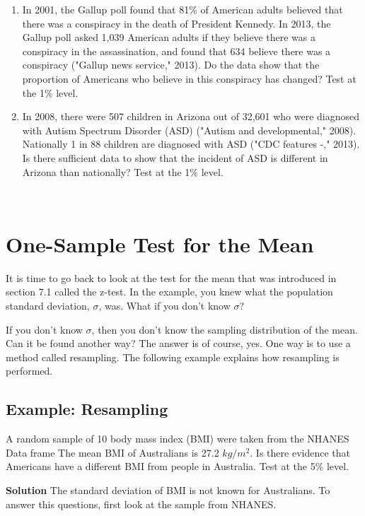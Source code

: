 \documentclass[
]{book}
\begin{document}
\begin{enumerate}
\item
  In 2001, the Gallup poll found that 81\% of American adults believed that there was a conspiracy in the death of President Kennedy. In 2013, the Gallup poll asked 1,039 American adults if they believe there was a conspiracy in the assassination, and found that 634 believe there was a conspiracy ("Gallup news service," 2013). Do the data show that the proportion of Americans who believe in this conspiracy has changed? Test at the 1\% level.
\item
  In 2008, there were 507 children in Arizona out of 32,601 who were diagnosed with Autism Spectrum Disorder (ASD) ("Autism and developmental," 2008). Nationally 1 in 88 children are diagnosed with ASD ("CDC features -," 2013). Is there sufficient data to show that the incident of ASD is different in Arizona than nationally? Test at the 1\% level.
\end{enumerate}

\textbf{\\
}

\hypertarget{one-sample-test-for-the-mean}{%
\section{One-Sample Test for the Mean}\label{one-sample-test-for-the-mean}}

It is time to go back to look at the test for the mean that was introduced in section 7.1 called the z-test. In the example, you knew what the population standard deviation, \(\sigma\), was. What if you don't know \(\sigma\)?

If you don't know \(\sigma\), then you don't know the sampling distribution of the mean. Can it be found another way? The answer is of course, yes. One way is to use a method called resampling. The following example explains how resampling is performed.

\hypertarget{example-resampling}{%
\subsection{Example: Resampling}\label{example-resampling}}

A random sample of 10 body mass index (BMI) were taken from the NHANES Data frame The mean BMI of Australians is 27.2 \(kg/m^2\). Is there evidence that Americans have a different BMI from people in Australia. Test at the 5\% level.

\textbf{Solution}
The standard deviation of BMI is not known for Australians. To answer this questions, first look at the sample from NHANES.
\end{document}

